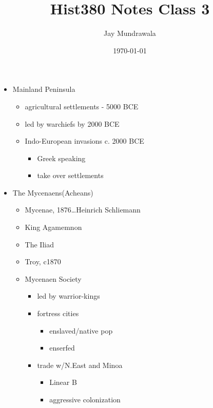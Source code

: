 \documentclass[11pt, a4paper]{article}
\begin{document}
\title{Hist380 Notes Class 3}
\author{Jay Mundrawala}
\date{\today}
\maketitle

\begin{itemize}
  \item Mainland Peninsula
    \begin{itemize}
      \item agricultural settlements - 5000 BCE
      \item led by warchiefs by 2000 BCE
      \item Indo-European invasions c. 2000 BCE
        \begin{itemize}
          \item Greek speaking
          \item take over settlements
        \end{itemize}
    \end{itemize}
  \item The Mycenaens(Acheans)
    \begin{itemize}
      \item Mycenae, 1876\dots Heinrich Schliemann
      \item King Agamemnon
      \item The Iliad
      \item Troy, c1870
      \item Mycenaen Society
        \begin{itemize}
          \item led by warrior-kings
          \item fortress cities
            \begin{itemize}
              \item enslaved/native pop
              \item enserfed
            \end{itemize}
          \item trade w/N.East and Minoa
            \begin{itemize}
              \item Linear B
              \item aggressive colonization


\end{itemize}
\end{itemize}
\end{itemize}
\end{itemize}
\end{document}
